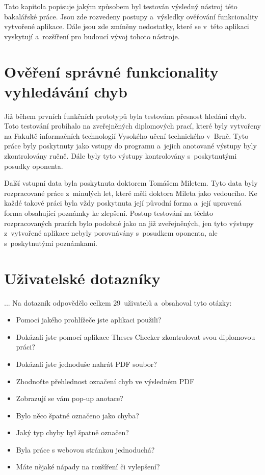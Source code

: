 Tato kapitola popisuje jakým způsobem byl testován výsledný nástroj této
bakalářské práce. Jsou zde rozvedeny postupy a~výsledky ověřování funkcionality
vytvořené aplikace. Dále jsou zde zmíněny nedostatky, které se v~této aplikaci
vyskytují a~rozšíření pro budoucí vývoj tohoto nástroje. 



\section{Ověření správné funkcionality vyhledávání chyb}
Již během prvních funkčních prototypů byla testována přesnost hledání
chyb. Toto testování probíhalo na zveřejněných diplomových prací, které byly
vytvořeny na Fakultě informačních technologií Vysokého učení technického v~Brně.
Tyto práce byly poskytnuty jako vstupy do programu a~jejich anotované
výstupy byly zkontrolovány ručně. Dále byly tyto výstupy kontrolovány
s~poskytnutými posudky oponenta.

Další vstupní data byla poskytnuta doktorem Tomášem Miletem. Tyto data
byly rozpracované práce z~minulých let, které měli doktora Mileta jako
vedoucího. Ke každé takové práci byla vždy poskytnuta její původní forma
a~její upravená forma obsahující poznámky ke zlepšení. Postup testování
na těchto rozpracovaných pracích bylo podobné jako na již zveřejněných, 
jen tyto výstupy z~vytvořené aplikace nebyly porovnávány s~posudkem oponenta,
ale s~poskytnutými poznámkami.



\section{Uživatelské dotazníky}
... 
Na dotazník odpovědělo celkem 29~uživatelů a~obsahoval tyto otázky:
\begin{itemize}
    \item Pomocí jakého prohlížeče jste aplikaci použili?
    \item Dokázali jste pomocí aplikace Theses Checker zkontrolovat svou
    diplomovou práci?
    \item Dokázali jste jednoduše nahrát PDF soubor?
    \item Zhodnoťte přehlednost označení chyb ve výsledném PDF
    \item Zobrazují se vám pop-up anotace?
    \item Bylo něco špatně označeno jako chyba?
    \item Jaký typ chyby byl špatně označen?
    \item Byla práce s webovou stránkou jednoduchá?
    \item Máte nějaké nápady na rozšíření či vylepšení?
\end{itemize}

